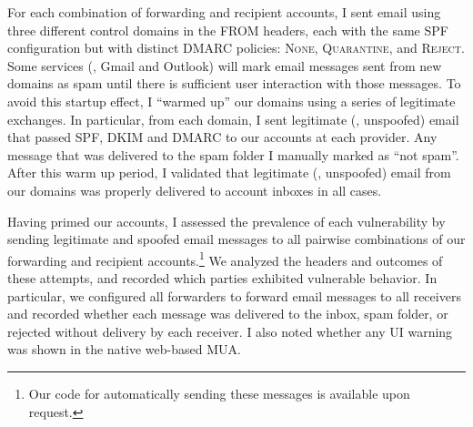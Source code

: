 For each combination of forwarding and recipient accounts, I sent
email using three different control domains in the FROM headers, each
with the same SPF configuration but with distinct DMARC policies:
\textsc{None}, \textsc{Quarantine}, and \textsc{Reject}.
%
Some services (\eg, Gmail and Outlook) will mark email messages sent
from new domains as spam until there is sufficient user interaction
with those messages.  To avoid this startup effect, I ``warmed up''
our domains using a series of legitimate exchanges.  In particular,
from each domain, I sent legitimate (\ie, unspoofed) email that
passed SPF, DKIM and DMARC to our accounts at each provider.  Any
message that was delivered to the spam folder I manually marked as
``not spam''.  After this warm up period, I validated that legitimate
(\ie, unspoofed) email from our domains was properly delivered to
account inboxes in all cases.

Having primed our accounts, I assessed the prevalence of each vulnerability by
sending legitimate and spoofed email messages to all
pairwise combinations of our forwarding and recipient accounts.\footnote{Our code for automatically sending these messages is available upon request.}  We
analyzed the headers and outcomes of these attempts, and recorded
which parties exhibited vulnerable behavior.  In particular, we
configured all forwarders to forward email messages to all receivers
and recorded whether each message was delivered to the inbox, spam
folder, or rejected without delivery by each receiver.  I also noted
whether any UI warning was shown in the native web-based MUA. 







